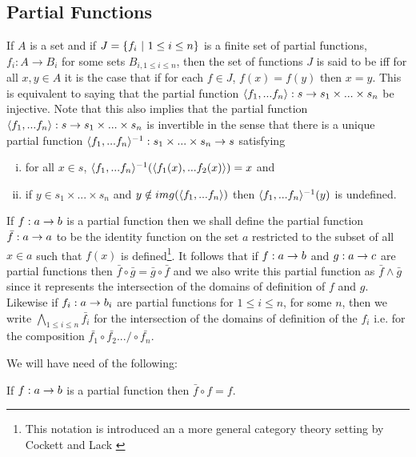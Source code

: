 \subsection{Partial Functions}
If $A$ is a set and if $J= \left\{f_i \ \middle|\  1\leq i \leq n\right\}$ is a finite set of partial functions, $f_i: A \rightarrow B_i$   for some sets $B_{i, 1 \leq i \leq n}$,  then the set of functions 
$J$ is said to be  iff for all $x,y \in A$ it is the case that  if  for each 
$f \in J$, $f(x)=f(y)$ then $x=y$. 
This  is equivalent to saying that  the partial function $\langle f_1,...f_n\rangle: s \rightarrow s_1 \times ... \times s_n $ be injective. Note that this also implies that the partial function $\langle f_1,...f_n\rangle: s \rightarrow s_1 \times ... \times s_n $ is invertible in the sense that there is a unique partial function $\langle f_1,...f_n\rangle^{-1} : s_1 \times ... \times s_n \rightarrow s$ satisfying
\begin{enumerate} [(i)]
\item for all $x \in s$, $\langle f_1,...f_n\rangle^{-1}(\langle f_1(x),...f_2(x) \rangle ) = x$ and 
\item  if $y \in s_1 \times ... \times s_n $ and
$y \notin img(\langle f_1,...f_n\rangle)$ then $\langle f_1,...f_n\rangle^{-1}(y)$ is undefined. 
\end{enumerate}

If $f: a \rightarrow b$ is a partial function then we shall define the partial function $\bar{f}: a \rightarrow a$ to be the identity function on the set $a$
restricted to the subset of all $x \in a$ such that $f(x)$ is defined\footnote{
This notation is introduced an a more general category theory setting by Cockett and Lack \cite{COCKETT2002}}. It follows that if $f: a \rightarrow b$ and $g: a \rightarrow c$ are partial functions
then $\bar{f} \circ \bar{g} = \bar{g} \circ \bar{f}$ and we also write this partial function as $\bar{f} \wedge \bar{g}$ since it represents the intersection
of the domains of definition of $f$ and $g$. Likewise if $f_i:a \rightarrow b_i$ are partial functions for $1 \leq i \leq n$, for some $n$, then we write $\bigwedge\limits_{1 \leq i \leq n}{\bar{f_i}}$ for the intersection of the domains of definition of the $f_i$ i.e. for the composition
$\bar{f_1}\circ \bar{f_2} .../ \circ \bar{f_n}$.

We will have need of the following:
\begin{lemma}
If $f: a \rightarrow b$ is a partial function then $\bar{f} \circ f = f$.
\end{lemma}

